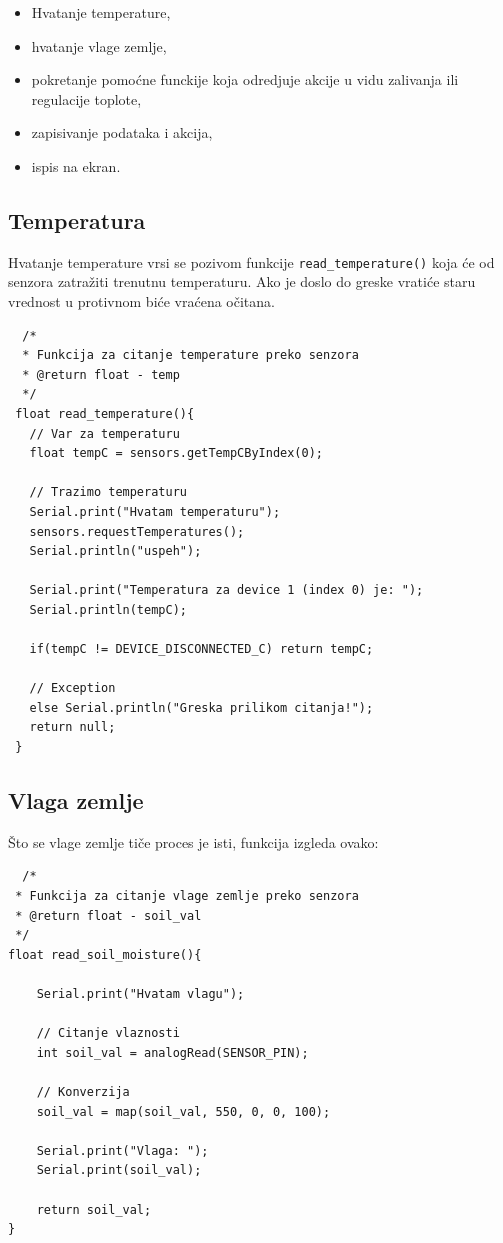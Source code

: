 \documentclass[a4paper,11pt]{book}
\begin{document}
\hrulefill
\begin{itemize}
  \item Hvatanje temperature,
  \item hvatanje vlage zemlje,
  \item pokretanje pomoćne funckije koja odredjuje akcije u vidu zalivanja ili regulacije toplote,
  \item zapisivanje podataka i akcija,
  \item ispis na ekran.
\end{itemize}
\hrulefill

\subsection{Temperatura}

Hvatanje temperature vrsi se pozivom funkcije \verb|read_temperature()| koja će od senzora zatražiti trenutnu temperaturu. Ako je doslo do greske vratiće staru vrednost u protivnom biće vraćena očitana. 

\begin{lstlisting}
  /*
  * Funkcija za citanje temperature preko senzora
  * @return float - temp
  */
 float read_temperature(){
   // Var za temperaturu
   float tempC = sensors.getTempCByIndex(0);
   
   // Trazimo temperaturu
   Serial.print("Hvatam temperaturu");
   sensors.requestTemperatures();
   Serial.println("uspeh");
 
   Serial.print("Temperatura za device 1 (index 0) je: ");
   Serial.println(tempC);
 
   if(tempC != DEVICE_DISCONNECTED_C) return tempC;
 
   // Exception
   else Serial.println("Greska prilikom citanja!");
   return null;
 }
\end{lstlisting}
  
\subsection{Vlaga zemlje}

Što se vlage zemlje tiče proces je isti, funkcija izgleda ovako:

\begin{lstlisting}
  /*
 * Funkcija za citanje vlage zemlje preko senzora
 * @return float - soil_val
 */
float read_soil_moisture(){

	Serial.print("Hvatam vlagu");

	// Citanje vlaznosti
	int soil_val = analogRead(SENSOR_PIN);

	// Konverzija
	soil_val = map(soil_val, 550, 0, 0, 100);

	Serial.print("Vlaga: ");
	Serial.print(soil_val);

	return soil_val;
}
  \end{lstlisting}
\end{document}

